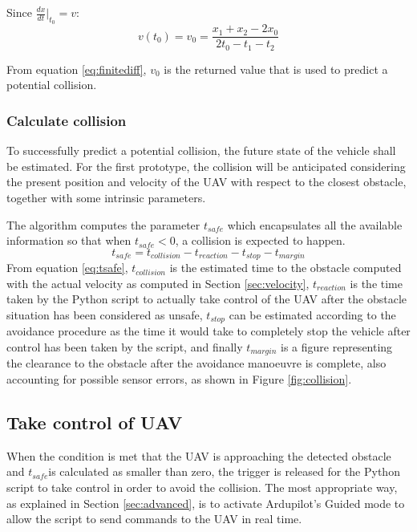 Since $\frac{dx}{dt}\big\rvert_{t_0}=v$:
\begin{equation}
	v\left(t_0\right)=v_0=\frac{x_1+x_2-2x_0}{2t_0-t_1-t_2}
	\label{eq:finitediff}
\end{equation}

From equation \eqref{eq:finitediff}, $v_0$ is the returned value that is used to predict a potential collision.

\subsubsection{Calculate collision}

To successfully predict a potential collision, the future state of the vehicle shall be estimated.
For the first prototype, the collision will be anticipated considering the present position and velocity of the UAV with respect to the closest obstacle, together with some intrinsic parameters.

The algorithm computes the parameter $t_{safe}$ which encapsulates all the available information so that when $t_{safe}<0$, a collision is expected to happen.
\begin{equation}
	t_{safe}=t_{collision}-t_{reaction}-t_{stop}-t_{margin}
	\label{eq:tsafe}
\end{equation}
From equation \eqref{eq:tsafe}, $t_{collision}$ is the estimated time to the obstacle computed with the actual velocity as computed in Section \ref{sec:velocity}, $t_{reaction}$ is the time taken by the Python script to actually take control of the UAV after the obstacle situation has been considered as unsafe, $t_{stop}$ can be estimated according to the avoidance procedure as the time it would take to completely stop the vehicle after control has been taken by the script, and finally $t_{margin}$ is a figure representing the clearance to the obstacle after the avoidance manoeuvre is complete, also accounting for possible sensor errors, as shown in Figure \ref{fig:collision}.



\subsection{Take control of UAV} \label{sec:takeControl}

When the condition is met that the UAV is approaching the detected obstacle and $t_{safe}$is calculated as smaller than zero, the trigger is released for the Python script to take control in order to avoid the collision.
The most appropriate way, as explained in Section \ref{sec:advanced}, is to activate Ardupilot's Guided mode to allow the script to send commands to the UAV in real time.

